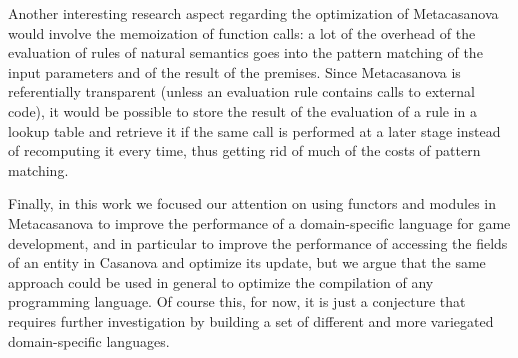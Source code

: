 Another interesting research aspect regarding the optimization of Metacasanova would involve the memoization of function calls: a lot of the overhead of the evaluation of rules of natural semantics goes into the pattern matching of the input parameters and of the result of the premises. Since Metacasanova is referentially transparent (unless an evaluation rule contains calls to external code), it would be possible to store the result of the evaluation of a rule in a lookup table and retrieve it if the same call is performed at a later stage instead of recomputing it every time, thus getting rid of much of the costs of pattern matching.

Finally, in this work we focused our attention on using functors and modules in Metacasanova to improve the performance of a domain-specific language for game development, and in particular to improve the performance of accessing the fields of an entity in Casanova and optimize its update, but we argue that the same approach could be used in general to optimize the compilation of any programming language. Of course this, for now, it is just a conjecture that requires further investigation by building a set of different and more variegated domain-specific languages.

